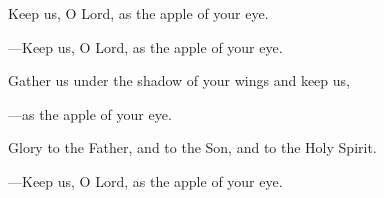 \responsory
\begin{hangpar}

Keep us, O Lord, as the apple of your eye.

{\color{red}---\thinspace}Keep us, O Lord, as the apple of your eye.

\medskip Gather us under the shadow of your wings and keep us,

{\color{red}---\thinspace}as the apple of your eye.

\medskip Glory to the Father, and to the Son, and to the Holy Spirit.

{\color{red}---\thinspace}Keep us, O Lord, as the apple of your eye.
\end{hangpar}
